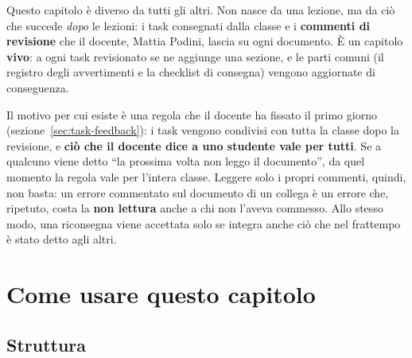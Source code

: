 Questo capitolo è diverso da tutti gli altri. Non nasce da una lezione, ma
da ciò che succede \emph{dopo} le lezioni: i task consegnati dalla classe e i
\textbf{commenti di revisione} che il docente, Mattia Podini, lascia su ogni
documento. È un capitolo \textbf{vivo}: a ogni task revisionato se ne aggiunge
una sezione, e le parti comuni (il registro degli avvertimenti e la checklist
di consegna) vengono aggiornate di conseguenza.

Il motivo per cui esiste è una regola che il docente ha fissato il primo
giorno (sezione~\ref{sec:task-feedback}): i task vengono condivisi con tutta
la classe dopo la revisione, e \textbf{ciò che il docente dice a uno studente
vale per tutti}. Se a qualcuno viene detto ``la prossima volta non leggo il
documento'', da quel momento la regola vale per l'intera classe. Leggere solo i
propri commenti, quindi, non basta: un errore commentato sul documento di un
collega è un errore che, ripetuto, costa la \textbf{non lettura} anche a chi
non l'aveva commesso. Allo stesso modo, una riconsegna viene accettata solo se
integra anche ciò che nel frattempo è stato detto agli altri.

\section{Come usare questo capitolo}
\label{rv:sec:come-usare}

\subsection{Struttura}

